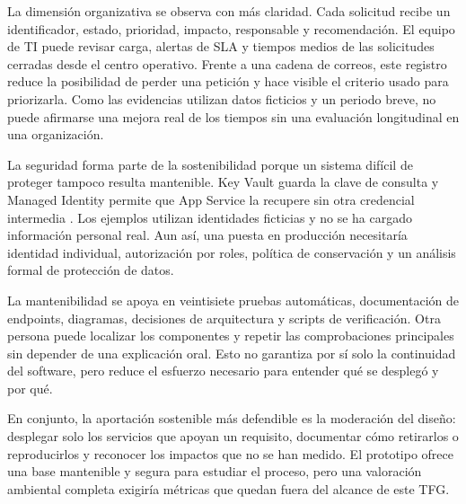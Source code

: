 La dimensión organizativa se observa con más claridad. Cada solicitud recibe un identificador, estado, prioridad, impacto, responsable y recomendación. El equipo de TI puede revisar carga, alertas de SLA y tiempos medios de las solicitudes cerradas desde el centro operativo. Frente a una cadena de correos, este registro reduce la posibilidad de perder una petición y hace visible el criterio usado para priorizarla. Como las evidencias utilizan datos ficticios y un periodo breve, no puede afirmarse una mejora real de los tiempos sin una evaluación longitudinal en una organización.

La seguridad forma parte de la sostenibilidad porque un sistema difícil de proteger tampoco resulta mantenible. Key Vault guarda la clave de consulta y Managed Identity permite que App Service la recupere sin otra credencial intermedia \cite{azure_security_design}. Los ejemplos utilizan identidades ficticias y no se ha cargado información personal real. Aun así, una puesta en producción necesitaría identidad individual, autorización por roles, política de conservación y un análisis formal de protección de datos.

La mantenibilidad se apoya en veintisiete pruebas automáticas, documentación de endpoints, diagramas, decisiones de arquitectura y scripts de verificación. Otra persona puede localizar los componentes y repetir las comprobaciones principales sin depender de una explicación oral. Esto no garantiza por sí solo la continuidad del software, pero reduce el esfuerzo necesario para entender qué se desplegó y por qué.

En conjunto, la aportación sostenible más defendible es la moderación del diseño: desplegar solo los servicios que apoyan un requisito, documentar cómo retirarlos o reproducirlos y reconocer los impactos que no se han medido. El prototipo ofrece una base mantenible y segura para estudiar el proceso, pero una valoración ambiental completa exigiría métricas que quedan fuera del alcance de este TFG.
